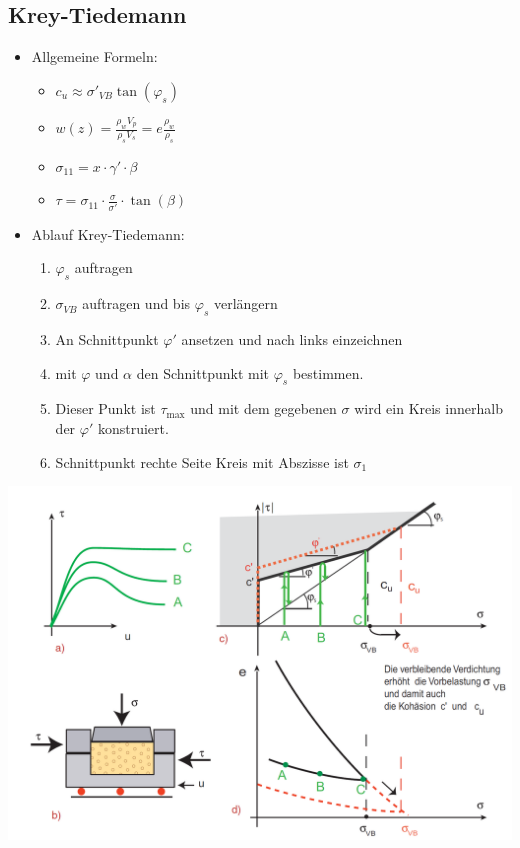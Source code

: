 \documentclass[fleqn,twoside]{article}
\begin{document}
\subsection{Krey-Tiedemann}\label{Scherversuch}
		
\begin{minipage}{0.35\textwidth}
\begin{itemize}
	\item Allgemeine Formeln:
	\begin{itemize}
		\item $c_u \approx \sigma'_{VB} \tan(\varphi_s)$
		\item $w(z)= \frac{\rho_w V_p}{\rho_s V_s}=e \frac{\rho_w}{\rho_s}$
		\item$\sigma_{11}=x \cdot \gamma' \cdot \beta$
		\item$\tau = \sigma_{11}  \cdot \frac{\sigma}{\sigma'} \cdot \tan(\beta)$
	\end{itemize}
	\item Ablauf Krey-Tiedemann:
	\begin{enumerate}
		\item $\varphi_s$ auftragen
		\item $\sigma_{VB}$ auftragen und bis $\varphi_s$ verlängern
		\item An Schnittpunkt $\varphi '$ ansetzen und nach links einzeichnen
		\item mit $\varphi$ und $\alpha$ den Schnittpunkt mit $\varphi_s$ bestimmen.
		\item Dieser Punkt ist $\tau_{\max}$ und mit dem gegebenen $\sigma$ wird ein Kreis innerhalb der $\varphi '$ konstruiert.
		\item Schnittpunkt rechte Seite Kreis mit Abszisse ist $\sigma_1$
	\end{enumerate}
\end{itemize}
\end{minipage}		
\begin{minipage}{0.6\textwidth}
	\includegraphics[width=1\textwidth]{Grafiken/Krey-Tidemann-Kriterium.png}
\end{minipage}
\end{document}
